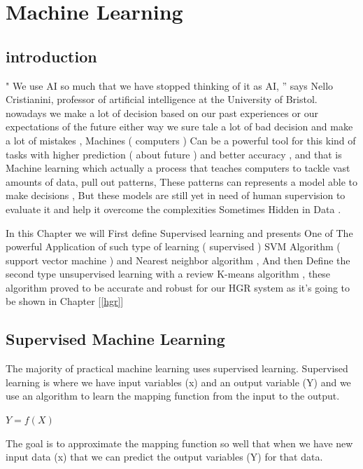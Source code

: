 
\chapter{Machine Learning} \label{ML}

\section{introduction}

" We use AI so much that we have stopped thinking of it as AI, ”  says Nello Cristianini,  professor of artificial  intelligence at the University of Bristol.   
nowadays we make a lot of decision based on our past experiences  or our expectations of the future either way we sure tale  a lot of bad decision and make a lot of mistakes , Machines ( computers ) Can be a powerful tool for this kind of tasks with higher prediction ( about future )  and better accuracy , and that is Machine learning which actually a process  that teaches computers to tackle vast amounts of data, pull out patterns, These patterns can represents a model able to  make decisions , But these models are still yet in need of human supervision to evaluate it and help it overcome the complexities Sometimes Hidden in Data .

In this Chapter we will First define Supervised learning and presents One of The powerful Application of such type of learning ( supervised ) SVM Algorithm ( support vector machine )  and Nearest neighbor algorithm , And then Define the second type unsupervised learning   with a review K-means algorithm , these algorithm  proved  to be accurate and robust  for our HGR system as it's going to be shown in  Chapter  [\ref{hgr}]

\section{Supervised Machine Learning}

The majority of practical machine learning uses supervised learning.
Supervised learning is where we have input variables (x) and an output variable (Y) and we use an algorithm to learn the mapping function from the input to the output.

$Y = f(X)$

The goal is to approximate the mapping function so well that when we have new input data (x) that we can predict the output variables (Y) for that data.

